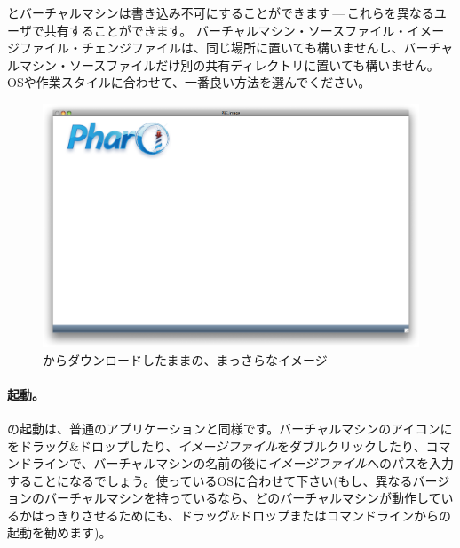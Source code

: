 \documentclass[a4paper,10pt,twoside]{book}
\begin{document}
とバーチャルマシンは書き込み不可にすることができます\,---\,これらを異なるユーザで共有することができます。
バーチャルマシン・ソースファイル・イメージファイル・チェンジファイルは、同じ場所に置いても構いませんし、バーチャルマシン・ソースファイルだけ別の共有ディレクトリに置いても構いません。
OSや作業スタイルに合わせて、一番良い方法を選んでください。


\begin{figure}[htb]
\centerline {\includegraphics[width=\textwidth]{startup}}
\caption{\pbe からダウンロードしたままの、まっさらなイメージ}
\end{figure}

\paragraph{起動。} \pharo の起動は、普通のアプリケーションと同様です。バーチャルマシンのアイコンにをドラッグ\&ドロップしたり、\emph{イメージファイル}をダブルクリックしたり、コマンドラインで、バーチャルマシンの名前の後に\emph{イメージファイル}へのパスを入力することになるでしょう。使っているOSに合わせて下さい(もし、異なるバージョンのバーチャルマシンを持っているなら、どのバーチャルマシンが動作しているかはっきりさせるためにも、ドラッグ\&ドロップまたはコマンドラインからの起動を勧めます)。
\end{document}

